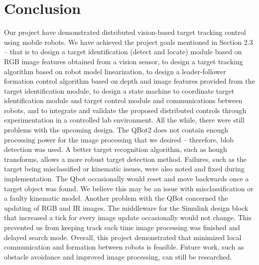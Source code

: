 \chapter{Conclusion}

Our project have demonstrated distributed vision-based target tracking control using mobile robots. We have achieved the project goals mentioned in Section 2.3 – that is to design a target identification (detect and locate) module based on RGB image features obtained from a vision sensor, to design a target tracking algorithm based on robot model linearization, to design a leader-follower formation control algorithm based on depth and image features provided from the target identification module, to design a state machine to coordinate target identification module and target control module and communications between robots, and to integrate and validate the proposed distributed controls through experimentation in a controlled lab environment. 
All the while, there were still problems with the upcoming design. The QBot2 does not contain enough processing power for the image processing that we desired – therefore, blob detection was used. A better target recognition algorithm, such as hough transforms, allows a more robust target detection method. Failures, such as the target being misclassified or kinematic issues, were also noted and fixed during implementation. The Qbot occasionally would reset and move backwards once a target object was found. We believe this may be an issue with misclassification or a faulty kinematic model. Another problem with the QBot concerned the updating of RGB and IR images. The middleware for the Simulink design block that increased a tick for every image update occasionally would not change. This prevented us from keeping track each time image processing was finished and delayed search mode.
Overall, this project demonstrated that minimized local communication and formation between robots is feasible. Future work, such as obstacle avoidance and improved image processing, can still be researched.